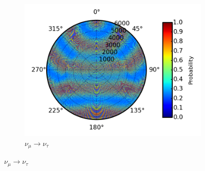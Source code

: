 \documentclass{beamer}
\begin{document}
\begin{frame}
\begin{figure}
\begin{subfigure}[b]{0.33\linewidth}
			\caption{ $\nu_{\mu} \rightarrow \nu_{\tau}$ }
			\includegraphics[width=\linewidth]{earth_0.1gev_numu2nutau_throughEarth.png}
		\end{subfigure}
	\end{figure}
\end{frame}
\end{document}
